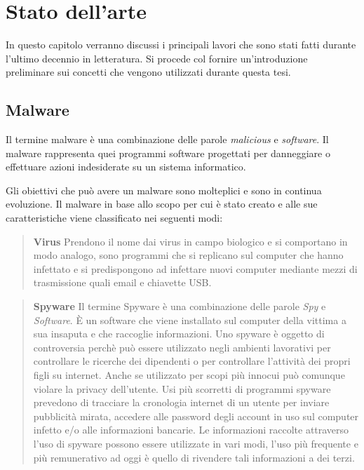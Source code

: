 \documentclass[../main.tex]{subfiles}
\begin{document}
\chapter{Stato dell'arte}

In questo capitolo verranno discussi i principali lavori che sono stati fatti durante l'ultimo decennio in letteratura. Si procede col fornire un'introduzione preliminare sui concetti che vengono utilizzati durante questa tesi.

\section{Malware}
Il termine malware è una combinazione delle parole \textit{malicious} e \textit{software}. Il malware rappresenta quei programmi software progettati per danneggiare o effettuare azioni indesiderate su un sistema informatico. \cite{MalwareDef}

Gli obiettivi che può avere un malware sono molteplici e sono in continua evoluzione. Il malware in base allo scopo per cui è stato creato e alle sue caratteristiche viene classificato nei seguenti modi:

\begin{verse}
				\textbf{Virus} Prendono il nome dai virus in campo biologico e si comportano in modo analogo, sono programmi che si replicano sul computer che hanno infettato e si predispongono ad infettare nuovi computer mediante mezzi di trasmissione quali email e chiavette USB. \cite{VirusDef}
\end{verse}

\begin{verse}
				\textbf{Spyware} Il termine Spyware è una combinazione delle parole \textit{Spy} e \textit{Software}. È un software che viene installato sul computer della vittima a sua insaputa e che raccoglie informazioni. 
				Uno spyware è oggetto di controversia perchè può essere utilizzato negli ambienti lavorativi per controllare le ricerche dei dipendenti o per controllare l'attività dei propri figli su internet. Anche se utilizzato per scopi più innocui può comunque violare la privacy dell'utente. \cite{Spyware2} \newline
				Usi più scorretti di programmi spyware prevedono di tracciare la cronologia internet di un utente per inviare pubblicità mirata, accedere alle password degli account in uso sul computer infetto e/o alle informazioni bancarie. Le informazioni raccolte attraverso l'uso di spyware possono essere utilizzate in vari modi, l'uso più frequente e più remunerativo ad oggi è quello di rivendere tali informazioni a dei terzi. \cite{Spyware1}
\end{verse}
\end{document}

